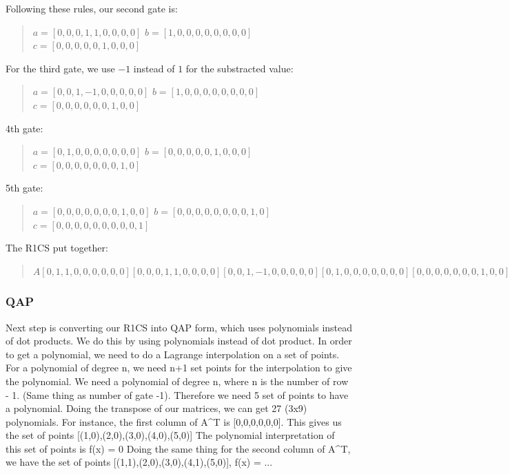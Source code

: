    Following these rules, our second gate is:
   \begin{quote}
      $a = [0,0,0,1,1,0,0,0,0]$
      $b = [1,0,0,0,0,0,0,0,0]$
      $c = [0,0,0,0,0,1,0,0,0]$
   \end{quote}

   For the third gate, we use $-1$ instead of $1$ for the substracted value:
   \begin{quote}
      $a = [0,0,1,-1,0,0,0,0,0]$
      $b = [1,0,0,0,0,0,0,0,0]$
      $c = [0,0,0,0,0,0,1,0,0]$
   \end{quote}

   4th gate:
   \begin{quote}
      $a = [0,1,0,0,0,0,0,0,0]$
      $b = [0,0,0,0,0,1,0,0,0]$
      $c = [0,0,0,0,0,0,0,1,0]$
   \end{quote}

   5th gate:
   \begin{quote}
      $a = [0,0,0,0,0,0,0,1,0,0]$
      $b = [0,0,0,0,0,0,0,0,1,0]$
      $c = [0,0,0,0,0,0,0,0,0,1]$
   \end{quote}
   

   The R1CS put together:
   \begin{quote}
      $
      A
      [0,1,1,0,0,0,0,0,0]
      [0,0,0,1,1,0,0,0,0]
      [0,0,1,-1,0,0,0,0,0]
      [0,1,0,0,0,0,0,0,0]
      [0,0,0,0,0,0,0,1,0,0]

      B 
      [1,0,0,0,0,0,0,0,0]
      [1,0,0,0,0,0,0,0,0]
      [1,0,0,0,0,0,0,0,0]
      [0,0,0,0,0,1,0,0,0]
      [0,0,0,0,0,0,0,0,1,0]

      C 
      [0,0,0,0,1,0,0,0,0]
      [0,0,0,0,0,1,0,0,0]
      [0,0,0,0,0,0,1,0,0]
      [0,0,0,0,0,0,0,1,0]
      [0,0,0,0,0,0,0,0,0,1]
      $
   \end{quote}


   \cite{VB16}


   \subsubsection{QAP}
   Next step is converting our R1CS into QAP form, which uses polynomials instead of dot products.
   We do this by using polynomials instead of dot product.
   In order to get a polynomial, we need to do a Lagrange interpolation on a set of points.
   For a polynomial of degree n, we need n+1 set points for the interpolation to give the polynomial.
   We need a polynomial of degree n, where n is the number of row - 1. (Same thing as number of gate -1). 
   Therefore we need 5 set of points to have a polynomial.
   Doing the transpose of our matrices, we can get 27 (3x9) polynomials.
   For instance, the first column of A^T is [0,0,0,0,0,0].
   This gives us the set of points [(1,0),(2,0),(3,0),(4,0),(5,0)]
   The polynomial interpretation of this set of points is f(x) = 0
   Doing the same thing for the second column of A^T,
   we have the set of points [(1,1),(2,0),(3,0),(4,1),(5,0)], f(x) = ...

